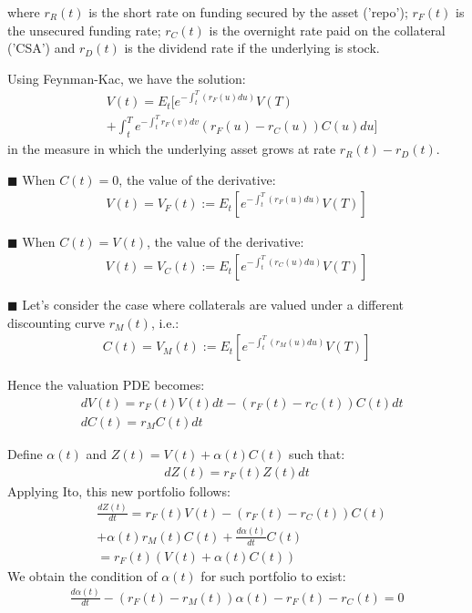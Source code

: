 \documentclass[twoside,twocolumn]{article}
\begin{document}
where $r_{R}(t)$ is the short rate on funding secured by the asset ('repo'); $r_{F}(t)$ is the unsecured funding rate; $r_{C}(t)$ is the overnight rate paid on the collateral ('CSA') and $r_{D}(t)$ is the dividend rate if the underlying is stock.


Using Feynman-Kac, we have the solution:
\begin{align*}
&V(t) = E_t [ e^{-\int_t^T(r_{F}(u) du)}V(T) \\
& + \int_t^T e^{-\int_t^T r_{F}(v)dv} (r_{F}(u) - r_{C}(u)) C(u) du ]
\end{align*}
in the measure in which the underlying asset grows at rate $r_{R}(t)-r_{D}(t)$.


$\blacksquare$ When $C(t) = 0$, the value of the derivative:
\begin{align*}
V(t) = V_{F}(t) := E_t [ e^{-\int_t^T(r_{F}(u) du)}V(T)]
\end{align*}

$\blacksquare$ When $C(t) = V(t)$, the value of the derivative:
\begin{align*}
V(t) = V_{C}(t) := E_t [ e^{-\int_t^T(r_{C}(u) du)}V(T)]
\end{align*}

$\blacksquare$ Let's consider the case where collaterals are valued under a different discounting curve $r_{M}(t)$, i.e.:
\begin{align*}
C(t) = V_{M}(t) := E_t [ e^{-\int_t^T(r_{M}(u) du)}V(T)]
\end{align*}

Hence the valuation PDE becomes:
\begin{align*}
&dV(t)=r_{F}(t)V(t)dt - (r_{F}(t)-r_{C}(t))C(t)dt \\
&dC(t)=r_{M}C(t)dt
\end{align*}

Define $\alpha(t)$ and $Z(t) = V(t)+\alpha(t)C(t)$ such that:
\begin{align*}
dZ(t) = r_{F}(t) Z(t) dt
\end{align*}
Applying Ito, this new portfolio follows:
\begin{align*}
&\frac{dZ(t)}{dt} = r_{F}(t)V(t) - (r_{F}(t)-r_{C}(t))C(t) \\
&+ \alpha(t)r_{M}(t)C(t) +  \frac{d\alpha(t)}{dt}C(t) \\
&= r_{F}(t)(V(t)+\alpha(t)C(t))
\end{align*}
We obtain the condition of $\alpha(t)$ for such portfolio to exist:
\begin{align*}
\frac{d\alpha(t)}{dt} - (r_{F}(t)-r_{M}(t)) \alpha(t) - r_{F}(t)-r_{C}(t)=0
\end{align*}
\end{document}
